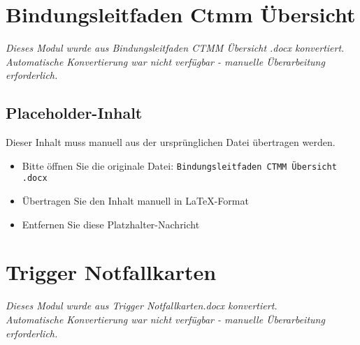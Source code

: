 


\section{Bindungsleitfaden Ctmm Übersicht}
\label{sec:bindungsleitfaden-ctmm-übersicht-}

\begin{center}
\textit{Dieses Modul wurde aus Bindungsleitfaden CTMM Übersicht .docx konvertiert.\\
Automatische Konvertierung war nicht verfügbar - manuelle Überarbeitung erforderlich.}
\end{center}


\subsection{Placeholder-Inhalt}

Dieser Inhalt muss manuell aus der ursprünglichen Datei übertragen werden.

\begin{itemize}
\item Bitte öffnen Sie die originale Datei: \texttt{Bindungsleitfaden CTMM Übersicht .docx}
\item Übertragen Sie den Inhalt manuell in LaTeX-Format
\item Entfernen Sie diese Platzhalter-Nachricht
\end{itemize}




\section{Trigger Notfallkarten}
\label{sec:trigger-notfallkarten}

\begin{center}
\textit{Dieses Modul wurde aus Trigger Notfallkarten.docx konvertiert.\\
Automatische Konvertierung war nicht verfügbar - manuelle Überarbeitung erforderlich.}
\end{center}

